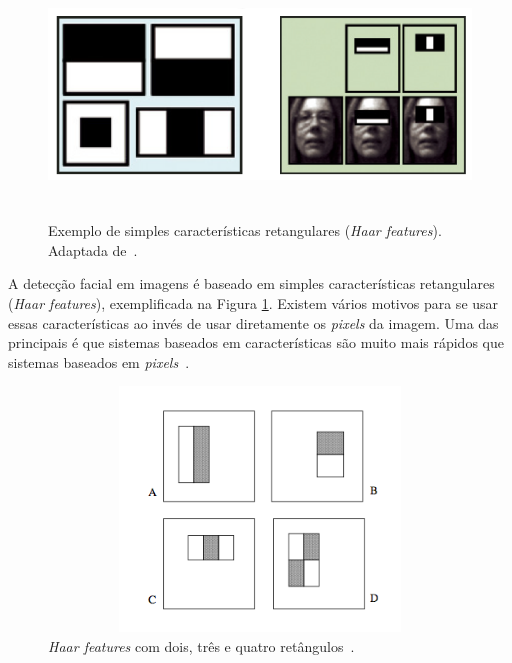 	\begin{figure}[hbt]
		\begin{center}
			\includegraphics[height=6.5cm,width=12.5cm]{figuras/2.FundamentacaoTeorica/haar_features.png}
		\end{center}
		\caption{Exemplo de simples características retangulares (\textit{Haar features}). Adaptada de~\cite{servodetection}.}
		\label{haarfeatures}
	\end{figure}

A detecção facial em imagens é baseado em simples características retangulares (\textit{Haar features}), exemplificada na Figura \ref{haarfeatures}. Existem vários motivos para se usar essas características ao invés de usar diretamente os \textit{pixels} da imagem. Uma das principais é que sistemas baseados em características são muito mais rápidos que sistemas baseados em \textit{pixels}~\cite{violajones}. 

\begin{figure}[hbt]
		\begin{center}
			\includegraphics[height=6.5cm,width=12.5cm]{figuras/2.FundamentacaoTeorica/haarfeaturestypes.png}
		\end{center}
		\caption{\textit{Haar features} com dois, três e quatro retângulos~\cite{violajones}.}
		\label{haarfeaturestypes}
	\end{figure}

